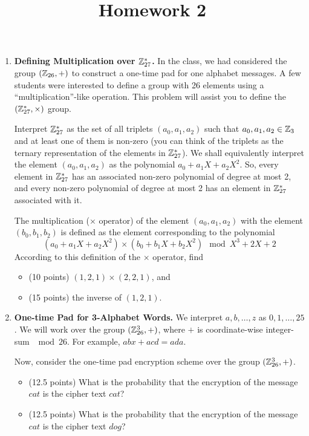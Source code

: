 \documentclass[11pt]{article}
\newcommand{\nextoddpage}{\checkoddpage\ifoddpage{\ \newpage\ \newpage}\else{\ \newpage}\fi}
\begin{document}
\title{Homework 2}

\date{}

\maketitle 

\thispagestyle{fancy}  
\pagestyle{fancy}      




\begin{enumerate}

\item {\bfseries Defining Multiplication over ${\mathbb Z}_{27}^*$.} 
  In the class, we had considered the group $({\mathbb Z}_{26},+)$ to construct a one-time pad for one alphabet messages. 
  A few students were interested to define a group with 26 elements using a ``multiplication''-like operation. 
  This problem will assist you to define the $({\mathbb Z}_{27}^*,\times)$ group. 
  
  Interpret ${\mathbb Z}_{27}^*$ as the set of all triplets $(a_0,a_1,a_2)$ such that $a_0,a_1,a_2 \in {\mathbb Z}_3$ and at least one of them is non-zero (you can think of the triplets as the ternary representation of the elements in ${\mathbb Z}_{27}^*$). 
  We shall equivalently interpret the element $(a_0,a_1,a_2)$ as the polynomial $a_0 + a_1X + a_2X^2$. 
  So, every element in ${\mathbb Z}_{27}^*$ has an associated non-zero polynomial of degree at most 2, and every non-zero polynomial of degree at most 2 has an element in ${\mathbb Z}_{27}^*$ associated with it. 
  
  The multiplication ($\times$ operator) of the element $(a_0,a_1,a_2)$ with the element $(b_0,b_1,b_2)$ is defined as the element corresponding to the polynomial
    $$(a_0 + a_1X + a_2X^2) \times (b_0 + b_1X + b_2X^2) \mod X^3 + 2 X + 2$$
  According to this definition of the $\times$ operator, find
  \begin{itemize}
  \item (10 points) $(1,2,1) \times (2,2,1) $, and 
  \item (15 points) the inverse of $(1,2,1)$. 
  \end{itemize} 


\nextoddpage 
\item {\bfseries One-time Pad for 3-Alphabet Words.} 
  We interpret $a,b,\dotsc,z$ as $0,1,\dotsc,25$. 
  We will work over the group $({\mathbb Z}^3_{26},+)$, where $+$ is coordinate-wise integer-sum $\mod 26$. 
  For example, $abx + acd = ada$. 
  
  Now, consider the one-time pad encryption scheme over the group $({\mathbb Z}^3_{26},+)$. 
  \begin{itemize}
  \item (12.5 points) What is the probability that the encryption of the message $cat$ is the cipher text $cat$? 
  \item (12.5 points) What is the probability that the encryption of the message $cat$ is the cipher text $dog$? 
  \end{itemize}  
  

\end{enumerate}
\end{document}
